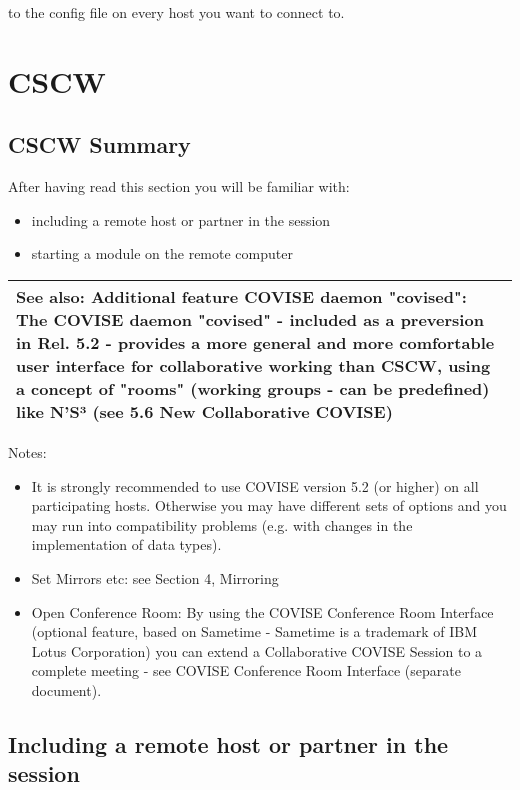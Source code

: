 to the config file on every host you want to connect to.


\section{CSCW}
\label{CSCW}

\subsection{CSCW Summary}

After having read this section you will be familiar with:

\begin{itemize}
\item including a remote host or partner in the session
\item starting a module on the remote computer
\end{itemize}

\begin{longtable}{|p{14cm}|}
\hline
\newline
{\bf See also: Additional feature COVISE daemon "covised":}\newline
The COVISE daemon "covised" - included as a {\bf preversion} in Rel. 5.2 - 
provides a more general and more comfortable user interface for collaborative 
working than CSCW, using a concept of "rooms" (working groups - can be {\bf predefined}) 
like N'S³ (see {\bf 5.6 New Collaborative COVISE})\newline 
\\									
\hline
\end{longtable}

Notes:
\begin{itemize}
\item It is strongly recommended to use COVISE version 5.2 (or higher) on all
participating hosts. Otherwise you may have different sets of options and you may run into
compatibility problems (e.g. with changes in the implementation of data types).  
\item Set Mirrors etc: see Section 4, Mirroring
\item Open Conference Room: By using the COVISE Conference Room Interface (optional feature, based on Sametime - Sametime is a trademark of IBM Lotus
Corporation) you can extend a Collaborative COVISE Session to a complete meeting - see COVISE Conference
Room Interface (separate document).
\end{itemize}

\subsection{Including a remote host or partner in the session}

